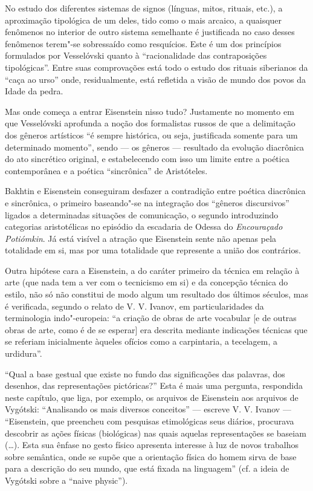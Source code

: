 No estudo dos diferentes sistemas de signos (línguas, mitos, rituais,
etc.), a aproximação tipológica de um deles, tido como o mais arcaico,
a quaisquer fenômenos no interior de outro sistema semelhante é
justificada no caso desses fenômenos terem"-se sobressaído como
resquícios. Este é um dos princípios formulados por Vesselóvski quanto à
``racionalidade das contraposições tipológicas''. Entre suas
comprovações está todo o estudo dos rituais siberianos da ``caça ao urso'' onde, residualmente, está refletida a visão de mundo
dos povos da Idade da pedra.

Mas onde começa a entrar Eisenstein nisso tudo? Justamente no momento em
que Vesselóvski aprofunda a noção dos formalistas russos de que a
delimitação dos gêneros artísticos ``é sempre histórica, ou seja,
justificada somente para um determinado momento'', sendo --- os gêneros ---
resultado da evolução diacrônica do ato sincrético original, e
estabelecendo com isso um limite entre a poética contemporânea e a
poética ``sincrônica'' de Aristóteles.

Bakhtin e Eisenstein conseguiram desfazer a contradição entre poética
diacrônica e sincrônica, o primeiro baseando"-se na integração dos
``gêneros discursivos'' ligados a determinadas situações de comunicação,
o segundo introduzindo categorias aristotélicas no episódio da escadaria
de Odessa do \emph{Encouraçado Potiómkin}. Já está visível a atração
que Eisenstein sente não apenas pela totalidade em si, mas por uma
totalidade que represente a união dos contrários.

Outra hipótese cara a Eisenstein, a do caráter primeiro da técnica em
relação à arte (que nada tem a ver com o tecnicismo em si) e da
concepção técnica do estilo, não só não constitui de modo algum um
resultado dos últimos séculos, mas é verificada, segundo o relato de
V. V. Ivanov, em particularidades da terminologia indo"-europeia: ``a
criação de obras de arte vocabular [e de outras obras de arte, como é
de se esperar] era descrita mediante indicações técnicas que se referiam
inicialmente àqueles ofícios como a carpintaria, a tecelagem, a
urdidura''.

``Qual a base gestual que existe no fundo das significações das
palavras, dos desenhos, das representações pictóricas?'' Esta é mais uma
pergunta, respondida neste capítulo, que liga, por exemplo, os arquivos
de Eisenstein aos arquivos de Vygótski: ``Analisando os mais diversos
conceitos'' --- escreve V. V. Ivanov --- ``Eisenstein, que preencheu com
pesquisas etimológicas seus diários, procurava descobrir as ações
físicas (biológicas) nas quais aquelas representações se baseiam (\ldots{}).
Esta sua ênfase no gesto físico apresenta interesse à luz de novos
trabalhos sobre semântica, onde se supõe que a orientação física do
homem sirva de base para a descrição do seu mundo, que está fixada na
linguagem'' (cf. a ideia de Vygótski sobre a ``naive physic'').

